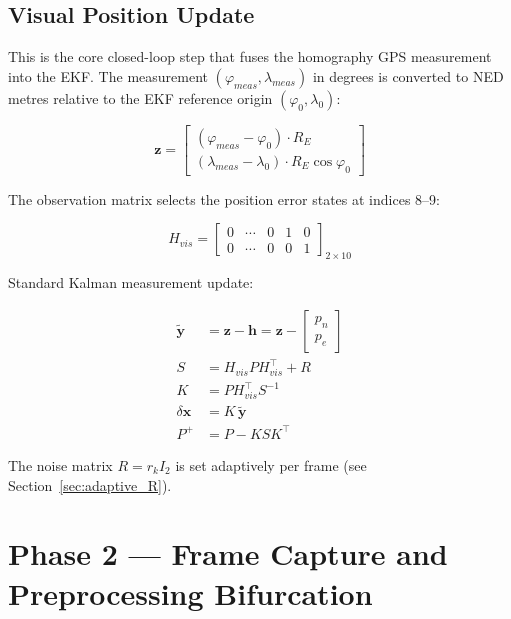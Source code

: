 \documentclass[12pt,a4paper]{article}
\newcommand{\bx}{\mathbf{x}}
\newcommand{\bz}{\mathbf{z}}
\newcommand{\bh}{\mathbf{h}}
\begin{document}
\subsection{Visual Position Update}

This is the core closed-loop step that fuses the homography GPS measurement
into the EKF. The measurement $({\varphi}_{meas}, {\lambda}_{meas})$ in degrees is
converted to NED metres relative to the EKF reference origin
$({\varphi}_0, {\lambda}_0)$:

\begin{equation}
    \bz = \begin{bmatrix}
        (\varphi_{meas} - \varphi_0) \cdot R_E \\
        (\lambda_{meas} - \lambda_0) \cdot R_E \cos\varphi_0
    \end{bmatrix}
    \label{eq:visual_meas}
\end{equation}

The observation matrix selects the position error states at indices 8--9:

\begin{equation}
    H_{vis} =
    \begin{bmatrix}
        0 & \cdots & 0 & 1 & 0 \\
        0 & \cdots & 0 & 0 & 1
    \end{bmatrix}_{2 \times 10}
    \label{eq:H_vis}
\end{equation}

Standard Kalman measurement update:

\begin{align}
    \tilde{\mathbf{y}} &= \bz - \bh = \bz - \begin{bmatrix}p_n \\ p_e\end{bmatrix} \\
    S &= H_{vis} P H_{vis}^\top + R \\
    K &= P H_{vis}^\top S^{-1} \\
    \delta\bx &= K\,\tilde{\mathbf{y}} \\
    P^+ &= P - K S K^\top
    \label{eq:kalman}
\end{align}

\noindent The noise matrix $R = r_k I_2$ is set adaptively per frame (see
Section~\ref{sec:adaptive_R}).

\section{Phase 2 --- Frame Capture and Preprocessing Bifurcation}
\end{document}
